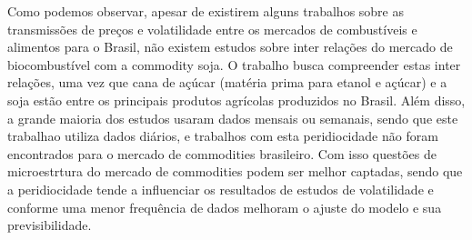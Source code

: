 	Como podemos observar, apesar de existirem alguns trabalhos sobre as transmissões de preços e volatilidade entre os mercados de combustíveis e alimentos para o Brasil, não existem estudos sobre inter relações do mercado de biocombustível com a commodity soja. O trabalho busca compreender estas inter relações, uma vez que cana de açúcar (matéria prima para etanol e açúcar) e a soja estão entre os principais produtos agrícolas produzidos no Brasil. Além disso, a grande maioria dos estudos usaram dados mensais ou semanais, sendo que este trabalhao utiliza dados diários, e trabalhos com esta peridiocidade não foram encontrados para o mercado de commodities brasileiro. Com isso questões de microestrtura do mercado de commodities podem ser melhor captadas, sendo que a peridiocidade tende a influenciar os resultados de estudos de volatilidade e conforme  uma menor frequência de dados melhoram o ajuste do modelo e sua previsibilidade.
	
	